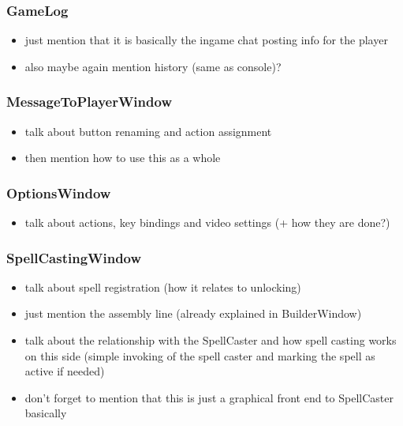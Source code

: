 \subsubsection{GameLog}

\begin{itemize}
    \item just mention that it is basically the ingame chat posting info
        for the player
    \item also maybe again mention history (same as console)?
\end{itemize}

\subsubsection{MessageToPlayerWindow}

\begin{itemize}
    \item talk about button renaming and action assignment
    \item then mention how to use this as a whole
\end{itemize}

\subsubsection{OptionsWindow}

\begin{itemize}
    \item talk about actions, key bindings and video settings
        (+ how they are done?)
\end{itemize}

\subsubsection{SpellCastingWindow}

\begin{itemize}
    \item talk about spell registration (how it relates to unlocking)
    \item just mention the assembly line (already explained in BuilderWindow)
    \item talk about the relationship with the SpellCaster and how spell casting
        works on this side (simple invoking of the spell caster and marking
        the spell as active if needed)
    \item don't forget to mention that this is just a graphical front end
        to SpellCaster basically
\end{itemize}

